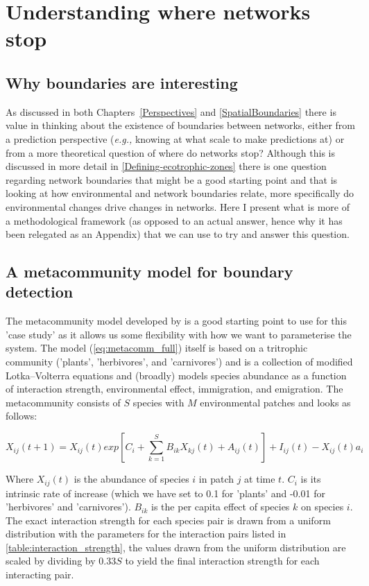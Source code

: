 \anglais
\doublespacing
\chapter{Understanding where networks stop}\label{supp:boundaries}

\section{Why boundaries are interesting}

As discussed in both Chapters~\ref{Perspectives} and \ref{SpatialBoundaries}
there is value in thinking about the existence of boundaries between networks, either from a prediction perspective (\emph{e.g.,} knowing at what scale to make predictions at) or from a more theoretical question of where do networks stop? Although this is discussed in more detail in \autoref{Defining-ecotrophic-zones} there is one question regarding network boundaries that might be a good starting point and that is looking at how environmental and network boundaries relate, more specifically do environmental changes drive changes in networks. Here I present what is more of a methodological framework (as opposed to an actual answer, hence why it has been relegated as an Appendix) that we can use to try and answer this question.

\section{A metacommunity model for boundary detection}

The metacommunity model developed by \cite{Thompson2017Dispersal} is a good starting point to use for this 'case study' as it allows us some flexibility with how we want to parameterise the system. The model (\ref{eq:metacomm_full}) itself is based on a tritrophic community ('plants', 'herbivores', and 'carnivores') and is a collection of modified Lotka–Volterra equations and (broadly) models species abundance as a function of interaction strength, environmental effect, immigration, and emigration. The metacommunity consists of $S$ species with $M$ environmental patches and looks as follows:

\begin{equation} \label{eq:metacomm_full}
X_{ij}(t+1)=X_{ij}(t)exp\left[C_{i} + \sum_{k=1}^{S}B_{ik}X_{kj}(t)+A_{ij}(t)\right]+I_{ij}(t)-X_{ij}(t)a_{i}
\end{equation}

Where $X_{ij}(t)$ is the abundance of species $i$ in patch $j$ at time $t$. $C_i$
is its intrinsic rate of increase (which we have set to 0.1 for 'plants' and
-0.01 for 'herbivores' and 'carnivores'). $B_{ik}$ is the per capita effect of
species $k$ on species $i$. The exact interaction strength for each species pair
is drawn from a uniform distribution with the parameters for the 
interaction pairs listed in \autoref{table:interaction_strength}, the values
drawn from the uniform distribution are scaled by dividing by $0.33S$ to yield
the final interaction strength for each interacting pair.


